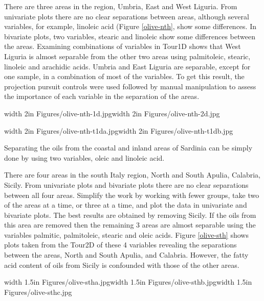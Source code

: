 \documentclass{article}
\begin{document}
There are three areas in the region, Umbria, East and West
Liguria. From univariate plots there are no clear separations between
areas, although several variables, for example, linoleic acid (Figure
\ref{olive-nth}, show some differences. In bivariate plots, two variables, 
stearic and linoleic show some differences between the
areas. Examining combinations of variables in Tour1D shows that West
Liguria is almost separable from the other two areas using
palmitoleic, stearic, linoleic and arachidic acids. Umbria and East
Liguria are separable, except for one sample, in a combination of most
of the variables. To get this result, the projection pursuit controls
were used followed by manual manipulation to assess the importance of
each variable in the separation of the areas.

\begin{figure*}[htbp]
\centerline{{\pdfimage width 2in {Figures/olive-nth-1d.jpg}}{\pdfimage width 2in {Figures/olive-nth-2d.jpg}}}
\centerline{{\pdfimage width 2in {Figures/olive-nth-t1da.jpg}}{\pdfimage width 2in {Figures/olive-nth-t1db.jpg}}}
\caption{Separation in the oils from areas of northern Italy, univariate, bivariate and multivariate plots.}
\label{olive-nth}
\end{figure*}


Separating the oils from the coastal and inland areas of Sardinia can
be simply done by using two variables, oleic and linoleic acid.


There are four areas in the south Italy region, North and South
Apulia, Calabria, Sicily. From univariate plots and bivariate plots
there are no clear separations between all four areas. Simplify the
work by working with fewer groups, take two of the areas at a time, or
three at a time, and plot the data in univariate and bivariate
plots. The best results are obtained by removing Sicily. If the oils
from this area are removed then the remaining 3 areas are almost
separable using the variables palmitic, palmitoleic, stearic and oleic
acids. Figure \ref{olive-sth} shows plots taken from the Tour2D of
these 4 variables revealing the separations between the areas, North
and South Apulia, and Calabria. However, the fatty acid content of
oils from Sicily is confounded with those of the other areas.

\begin{figure*}[htbp]
\centerline{{\pdfimage width 1.5in {Figures/olive-stha.jpg}}{\pdfimage width 1.5in {Figures/olive-sthb.jpg}}{\pdfimage width 1.5in {Figures/olive-sthc.jpg}}}
\caption{The areas of southern Italy are mostly separable, except for Sicily. }
\label{olive-sth}
\end{figure*}
\end{document}
